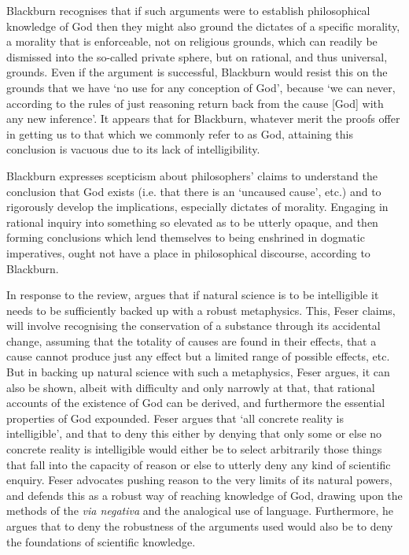 Blackburn recognises that if such arguments were to establish philosophical knowledge of God then they might also ground the dictates of a specific morality, a morality that is enforceable, not on religious grounds, which can readily be dismissed into the so-called private sphere, but on rational, and thus universal, grounds. Even if the argument is successful, Blackburn would resist this on the grounds that we have `no use for any conception of God', because `we can never, according to the rules of just reasoning return back from the cause [God] with any new inference'. It appears that for Blackburn, whatever merit the proofs offer in getting us to that which we commonly refer to as God, attaining this conclusion is vacuous due to its lack of intelligibility.

Blackburn expresses scepticism about philosophers' claims to understand the conclusion that God exists (i.e. that there is an `uncaused cause', etc.) and to rigorously develop the implications, especially dictates of morality. Engaging in rational inquiry into something so elevated as to be utterly opaque, and then forming conclusions which lend themselves to being enshrined in dogmatic imperatives, ought not have a place in philosophical discourse, according to Blackburn.

In response to the review, \textcite[][]{Feser2018TLS} argues that if natural science is to be intelligible it needs to be sufficiently backed up with a robust metaphysics. This, Feser claims, will involve recognising the conservation of a substance through its accidental change, assuming that the totality of causes are found in their effects, that a cause cannot produce just any effect but a limited range of possible effects, etc. But in backing up natural science with such a metaphysics, Feser argues, it can also be shown, albeit with difficulty and only narrowly at that, that rational accounts of the existence of God can be derived, and furthermore the essential properties of God expounded. Feser argues that `all concrete reality is intelligible', and that to deny this either by denying that only some or else no concrete reality is intelligible would either be to select arbitrarily those things that fall into the capacity of reason or else to utterly deny any kind of scientific enquiry. Feser advocates pushing reason to the very limits of its natural powers, and defends this as a robust way of reaching knowledge of God, drawing upon the methods of the \emph{via negativa} and the analogical use of language. Furthermore, he argues that to deny the robustness of the arguments used would also be to deny the foundations of scientific knowledge.

